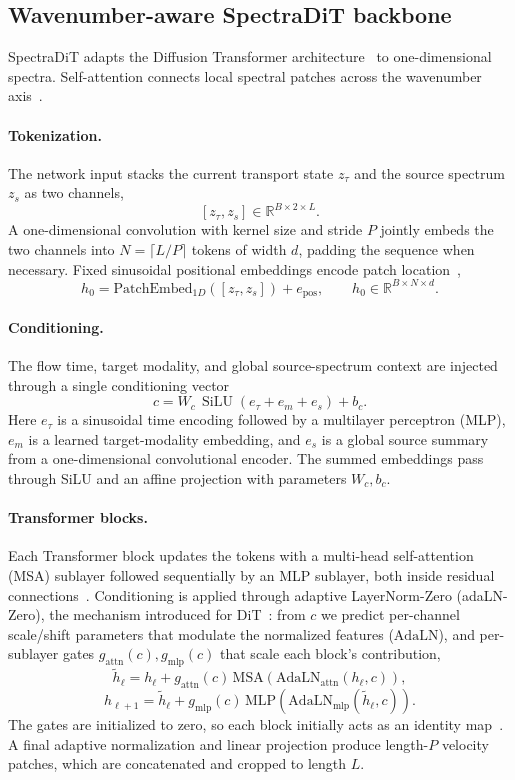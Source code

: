 \documentclass[pdflatex,sn-mathphys-num]{sn-jnl}%
\theoremstyle{thmstyleone}%
\theoremstyle{thmstyletwo}%
\theoremstyle{thmstylethree}%
\begin{document}
\subsection*{Wavenumber-aware SpectraDiT backbone}

SpectraDiT adapts the Diffusion Transformer architecture~\cite{peebles2023scalable} to one-dimensional spectra. Self-attention connects local spectral patches across the wavenumber axis~\cite{vaswani2017attention}.

\paragraph{Tokenization.}
The network input stacks the current transport state $z_\tau$ and the source spectrum $z_s$ as two channels,
\[
[z_\tau,z_s]\in\mathbb{R}^{B\times 2\times L}.
\]
A one-dimensional convolution with kernel size and stride $P$ jointly embeds the two channels into $N=\lceil L/P\rceil$ tokens of width $d$, padding the sequence when necessary. Fixed sinusoidal positional embeddings encode patch location~\cite{vaswani2017attention},
\[
h_0 = \mathrm{PatchEmbed}_{1D}([z_\tau,z_s]) + e_{\mathrm{pos}},
\qquad
h_0\in\mathbb{R}^{B\times N\times d}.
\]

\paragraph{Conditioning.}
The flow time, target modality, and global source-spectrum context are injected through a single conditioning vector
\[
c = W_c\,\operatorname{SiLU}\!\left(e_\tau + e_m + e_s\right)+b_c .
\]
Here $e_\tau$ is a sinusoidal time encoding followed by a multilayer perceptron (MLP), $e_m$ is a learned target-modality embedding, and $e_s$ is a global source summary from a one-dimensional convolutional encoder. The summed embeddings pass through SiLU and an affine projection with parameters $W_c,b_c$.

\paragraph{Transformer blocks.}
Each Transformer block updates the tokens with a multi-head self-attention (MSA) sublayer followed sequentially by an MLP sublayer, both inside residual connections~\cite{vaswani2017attention}. Conditioning is applied through adaptive LayerNorm-Zero (adaLN-Zero), the mechanism introduced for DiT~\cite{peebles2023scalable}: from $c$ we predict per-channel scale/shift parameters that modulate the normalized features ($\mathrm{AdaLN}$), and per-sublayer gates $g_{\mathrm{attn}}(c),g_{\mathrm{mlp}}(c)$ that scale each block's contribution,
\[
\tilde h_\ell
=h_\ell+g_{\mathrm{attn}}(c)\,
\mathrm{MSA}\!\left(\mathrm{AdaLN}_{\mathrm{attn}}(h_\ell,c)\right),
\]
\[
h_{\ell+1}
=\tilde h_\ell+g_{\mathrm{mlp}}(c)\,
\mathrm{MLP}\!\left(\mathrm{AdaLN}_{\mathrm{mlp}}(\tilde h_\ell,c)\right).
\]
The gates are initialized to zero, so each block initially acts as an identity map~\cite{peebles2023scalable}. A final adaptive normalization and linear projection produce length-$P$ velocity patches, which are concatenated and cropped to length $L$.
\end{document}
